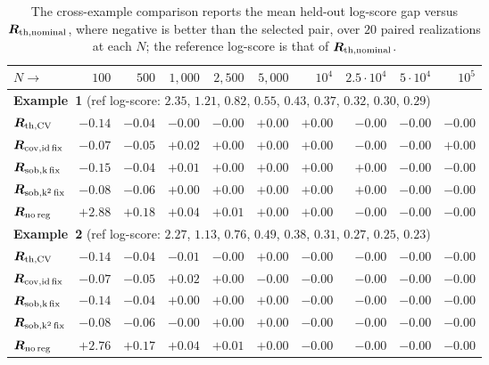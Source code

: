 \documentclass[supplement,review,hidelinks,onefignum,onetabnum]{siamart251216}
\newcommand{\mR}{\bm{R}}
\begin{document}
\begin{table}[h]
\centering\footnotesize
\setlength{\tabcolsep}{4pt}
\caption{The cross-example comparison reports the mean held-out log-score gap versus $\mR_{\rm th,nominal}$, where negative is better than the selected pair, over $20$ paired realizations at each $N$; the reference log-score is that of $\mR_{\rm th,nominal}$.}
\label{tab:cross-bench-results}
\begin{tabular}{l|rrrrrrrrr}
\toprule
$N \to$ & $100$ & $500$ & $1{,}000$ & $2{,}500$ & $5{,}000$ & $10^4$ & $2.5 \cdot 10^4$ & $5 \cdot 10^4$ & $10^5$ \\
\midrule
\multicolumn{10}{l}{\textbf{Example~1} \quad (ref log-score: $2.35$, $1.21$, $0.82$, $0.55$, $0.43$, $0.37$, $0.32$, $0.30$, $0.29$)} \\
$\mR_{\rm th,CV}$         & $-0.14$ & $-0.04$ & $-0.00$ & $-0.00$ & $+0.00$ & $+0.00$ & $-0.00$ & $-0.00$ & $-0.00$ \\
$\mR_{\rm cov,id\,fix}$    & $-0.07$ & $-0.05$ & $+0.02$ & $+0.00$ & $+0.00$ & $+0.00$ & $-0.00$ & $-0.00$ & $+0.00$ \\
$\mR_{\rm sob,k\,fix}$     & $-0.15$ & $-0.04$ & $+0.01$ & $+0.00$ & $+0.00$ & $+0.00$ & $+0.00$ & $-0.00$ & $-0.00$ \\
$\mR_{\rm sob,k^2\,fix}$   & $-0.08$ & $-0.06$ & $+0.00$ & $+0.00$ & $+0.00$ & $+0.00$ & $+0.00$ & $-0.00$ & $-0.00$ \\
$\mR_{\rm no\,reg}$       & $+2.88$ & $+0.18$ & $+0.04$ & $+0.01$ & $+0.00$ & $+0.00$ & $-0.00$ & $-0.00$ & $-0.00$ \\
\midrule
\multicolumn{10}{l}{\textbf{Example~2} \quad (ref log-score: $2.27$, $1.13$, $0.76$, $0.49$, $0.38$, $0.31$, $0.27$, $0.25$, $0.23$)} \\
$\mR_{\rm th,CV}$         & $-0.14$ & $-0.04$ & $-0.01$ & $-0.00$ & $+0.00$ & $-0.00$ & $-0.00$ & $-0.00$ & $-0.00$ \\
$\mR_{\rm cov,id\,fix}$    & $-0.07$ & $-0.05$ & $+0.02$ & $+0.00$ & $-0.00$ & $-0.00$ & $-0.00$ & $-0.00$ & $-0.00$ \\
$\mR_{\rm sob,k\,fix}$     & $-0.14$ & $-0.04$ & $+0.00$ & $+0.00$ & $+0.00$ & $-0.00$ & $-0.00$ & $-0.00$ & $-0.00$ \\
$\mR_{\rm sob,k^2\,fix}$   & $-0.08$ & $-0.06$ & $-0.00$ & $+0.00$ & $+0.00$ & $-0.00$ & $-0.00$ & $-0.00$ & $-0.00$ \\
$\mR_{\rm no\,reg}$       & $+2.76$ & $+0.17$ & $+0.04$ & $+0.01$ & $+0.00$ & $-0.00$ & $-0.00$ & $-0.00$ & $-0.00$ \\

\end{tabular}
\end{table}
\end{document}
